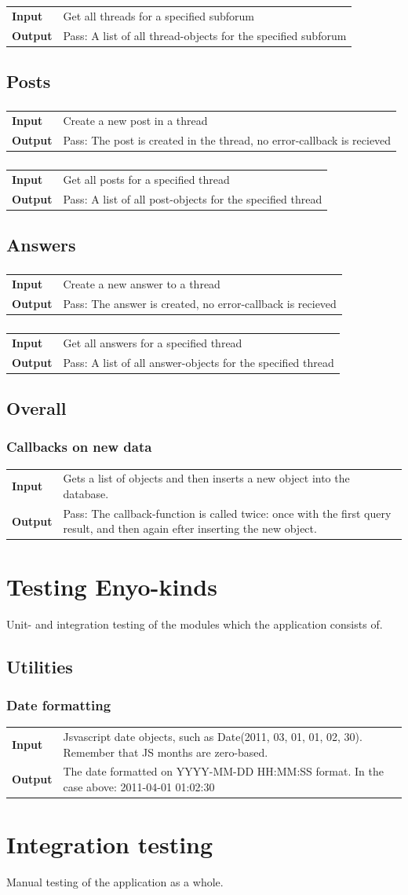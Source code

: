 \documentclass[a4paper, 12pt, titlepage]{article}
\newcommand{\testcase}[2]{
	\subsubsection{}
	\begin{tabular}{l p{11cm}}
	\bf{Input} & 
		#1\\
	\bf{Output} & 
		#2\\
	\end{tabular}
}
\newcommand{\ttestcase}[3]{
	\subsubsection{#1}
	\begin{tabular}{l p{11cm}}
	\bf{Input} & 
		#2\\
	\bf{Output} & 
		#3\\
	\end{tabular}
}
\begin{document}
		\testcase
		{
			Get all threads for a specified subforum
		}{
			Pass: A list of all thread-objects for the specified subforum
		}

	\subsection{Posts}

		\testcase
		{
			Create a new post in a thread
		}{
			Pass: The post is created in the thread, no error-callback is recieved
		}

		\testcase
		{
			Get all posts for a specified thread
		}{
			Pass: A list of all post-objects for the specified thread
		}

	\subsection{Answers}

		\testcase
		{
			Create a new answer to a thread
		}{
			Pass: The answer is created, no error-callback is recieved
		}

		\testcase
		{
			Get all answers for a specified thread
		}{
			Pass: A list of all answer-objects for the specified thread
		}


	\subsection{Overall}

		\ttestcase{Callbacks on new data}
		{
			Gets a list of objects and then inserts a new object into the database.
		}{
			Pass: The callback-function is called twice: once with the first query result, and then again efter inserting the new object.
		}

	\section{Testing Enyo-kinds}
	Unit- and integration testing of the modules which the application consists of.

	\subsection{Utilities}

		\ttestcase{Date formatting}
		{
			Jsvascript date objects, such as Date(2011, 03, 01, 01, 02, 30). Remember that JS months are zero-based.
		}{
			The date formatted on YYYY-MM-DD HH:MM:SS format. In the case above:
			2011-04-01 01:02:30
		}

	\section{Integration testing}
	Manual testing of the application as a whole.

	\subsection{}
\end{document}
